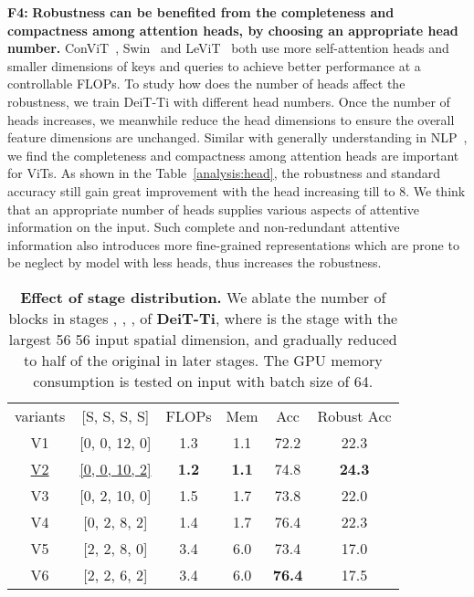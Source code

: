 \documentclass[10pt,twocolumn,letterpaper]{article}
\newcommand{\tablestyle}[2]{\setlength{\tabcolsep}{#1}\renewcommand{\arraystretch}{#2}\centering\footnotesize}
\begin{document}
\textbf{F4: }\textbf{Robustness can be benefited from the completeness and compactness among attention heads, by choosing an appropriate head number.} ConViT~\cite{d2021convit}, Swin~\cite{liu2021swin}  and LeViT~\cite{graham2021levit} both use more self-attention heads and smaller dimensions of keys and queries to achieve better performance at a controllable FLOPs. To study how does the number of heads affect the robustness, we train DeiT-Ti with different head numbers. Once the number of heads increases, we meanwhile reduce the head dimensions to ensure the overall feature dimensions are unchanged. Similar with generally understanding in NLP~\cite{michel2019sixteen}, we find the completeness and compactness among attention heads are important for ViTs. As shown in the Table~\ref{analysis:head}, the robustness and standard accuracy still gain great improvement with the head increasing till to 8. We think that an appropriate number of heads supplies various aspects of attentive information on the input. Such complete and non-redundant attentive information also introduces more fine-grained representations which are prone to be neglect by model with less heads, thus increases the robustness. 

\begin{table}[h]
	\centering
	\small
		\tablestyle{5pt}{1.05}
		\begin{tabular}{c|c|cc|cc}
			variants &{\scriptsize[{S}, {S}, {S}, {S}]} & FLOPs & Mem & Acc & Robust Acc \\
			\shline
			V1 & [0, 0, 12, 0] & 1.3 & 1.1 & 72.2 & 22.3  \\ 
			\underline{V2} & \underline{[0, 0, 10, 2]} & \textbf{1.2} & \textbf{1.1} & 74.8 & \textbf{24.3} \\ 
			V3 & [0, 2, 10, 0] & 1.5 & 1.7 & 73.8 & 22.0 \\ 
			V4 & [0, 2, 8, 2] & 1.4 & 1.7 & 76.4 &  22.3 \\ 
			V5 & [2, 2, 8, 0] & 3.4 & 6.0 & 73.4 & 17.0 \\ 
			V6 & [2, 2, 6, 2] & 3.4 & 6.0 & \textbf{76.4} & 17.5 \\ 
	\end{tabular}
	\caption{\textbf{Effect of stage  distribution.} We ablate the number of blocks in stages , , ,  of \textbf{DeiT-Ti}, where  is the stage with the largest 56  56 input spatial dimension, and gradually reduced to half of the original in later stages. The GPU memory consumption is tested on input with batch size of 64. 
	\label{tab:analysis_stage} }
\end{table}
\end{document}
